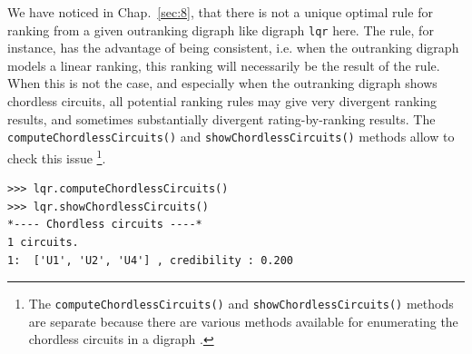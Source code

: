 We have noticed in Chap.~\ref{sec:8}, that there is not a unique optimal rule for ranking from a given outranking digraph like digraph \texttt{lqr} here. The \Copeland rule, for instance, has the advantage of being \Condorcet consistent, i.e. when the outranking digraph models a linear ranking, this ranking will necessarily be the result of the \Copeland rule. When this is not the case, and especially when the outranking digraph shows chordless circuits, all potential ranking rules may give very divergent ranking results, and sometimes substantially divergent rating-by-ranking results. The \texttt{computeChordlessCircuits()} and \texttt{showChordlessCircuits()} methods allow to check this issue \footnote{The \texttt{computeChordlessCircuits()} and \texttt{showChordlessCircuits()} methods are separate because there are various methods available for enumerating the chordless circuits in a digraph \citep{BIS-2010}.}.
\begin{lstlisting}
>>> lqr.computeChordlessCircuits()
>>> lqr.showChordlessCircuits()
*---- Chordless circuits ----*
1 circuits.
1:  ['U1', 'U2', 'U4'] , credibility : 0.200
\end{lstlisting}

